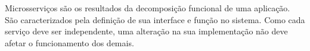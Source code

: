 Microsserviços são os resultados da decomposição funcional de uma aplicação. São caracterizados pela definição de sua interface e função no sistema. Como cada serviço deve ser independente, uma alteração na sua implementação não deve afetar o funcionamento dos demais. \cite{Pahl}






